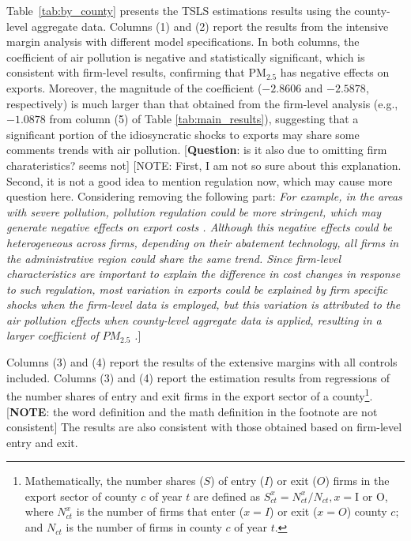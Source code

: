 \documentclass[12pt]{article}
\begin{document}
Table~\ref{tab:by_county} presents the TSLS estimations results using the
county-level aggregate data. Columns (1) and (2) report the results from the
intensive margin analysis with different model specifications. In both
columns, the coefficient of air pollution is negative and statistically
significant, which is consistent with firm-level results, confirming that $%
\mathrm{PM_{2.5}}$ has negative effects on exports. Moreover, the magnitude
of the coefficient ($-2.8606$ and $-2.5878$, respectively) is much larger
than that obtained from the firm-level analysis (e.g., $-1.0878$ from column
(5) of Table \ref{tab:main_results}), suggesting that a significant portion
of the idiosyncratic shocks to exports may share some comments trends with
air pollution. [\textbf{Question}: is it also due to omitting firm
charateristics? seems not] [NOTE: First, I am not so sure about this
explanation. Second, it is not a good idea to mention regulation now, which
may cause more question here. Considering removing the following part: \emph{%
For example, in the areas with severe pollution, pollution regulation could
be more stringent, which may generate negative effects on export costs %
\citep{cherniwchan2022environmental}. Although this negative effects could
be heterogeneous across firms, depending on their abatement technology, all
firms in the administrative region could share the same trend. Since
firm-level characteristics are important to explain the difference in cost
changes in response to such regulation, most variation in exports could be
explained by firm specific shocks when the firm-level data is employed, but
this variation is attributed to the air pollution effects when county-level
aggregate data is applied, resulting in a larger coefficient of }$PM_{2.5}$%
\emph{.}]

Columns (3) and (4) report the results of the extensive margins with all
controls included. Columns (3) and (4) report the estimation results from
regressions of the number shares of entry and exit firms in the export
sector of a county\footnote{%
Mathematically, the number shares ($S$) of entry ($I$) or exit ($O$) firms
in the export sector of county $c$ of year $t$ are defined as $%
S_{ct}^{x}=N_{ct}^{x}/N_{ct},x=\text{I or O}$, where $N_{ct}^{x}$ is the
number of firms that enter ($x=I$) or exit ($x=O$) county $c$; and $N_{ct}$
is the number of firms in county $c$ of year $t$.}.[\textbf{NOTE}: the word
definition and the math definition in the footnote are not consistent] The
results are also consistent with those obtained based on firm-level entry
and exit.
\end{document}
